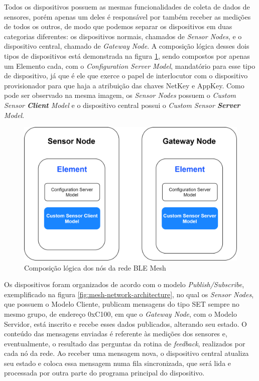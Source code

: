 \documentclass[../monografia.tex]{subfiles}
\begin{document}
Todos os dispositivos possuem as mesmas funcionalidades de coleta de dados de sensores, porém apenas um deles é responsável por também receber as medições de todos os outros, de modo que podemos separar os dispositivos em duas categorias diferentes: os dispositivos normais, chamados de \textit{Sensor Nodes}, e o dispositivo central, chamado de \textit{Gateway Node}. A composição lógica desses dois tipos de dispositivos está demonstrada na figura \ref{fig:mesh-node-architecture}, sendo compostos por apenas um Elemento cada, com o \textit{Configuration Server Model}, mandatório para esse tipo de dispositivo, já que é ele que exerce o papel de interlocutor com o dispositivo provisionador para que haja a atribuição das chaves NetKey e AppKey. Como pode ser observado na mesma imagem, os \textit{Sensor Nodes} possuem o \textit{Custom Sensor \textbf{Client} Model} e o dispositivo central possui o \textit{Custom Sensor \textbf{Server} Model}.

\begin{figure}[h!]
	\centering
	\includegraphics[scale=0.13]{mesh-node-architecture.png}
	\caption{Composição lógica dos nós da rede BLE Mesh}
	\label{fig:mesh-node-architecture}
\end{figure}

Os dispositivos foram organizados de acordo com o modelo \textit{Publish/Subscribe}, exemplificado na figura \ref{fig:mesh-network-architecture}, no qual os \textit{Sensor Nodes}, que possuem o Modelo Cliente, publicam mensagens do tipo SET sempre no mesmo grupo, de endereço 0xC100, em que o \textit{Gateway Node}, com o Modelo Servidor, está inscrito e recebe esses dados publicados, alterando seu estado. O conteúdo das mensagens enviadas é referente às medições dos sensores e, eventualmente, o resultado das perguntas da rotina de \textit{feedback}, realizados por cada nó da rede. Ao receber uma mensagem nova, o dispositivo central atualiza seu estado e coloca essa mensagem numa fila sincronizada, que será lida e processada por outra parte do programa principal do dispositivo. 
\end{document}
